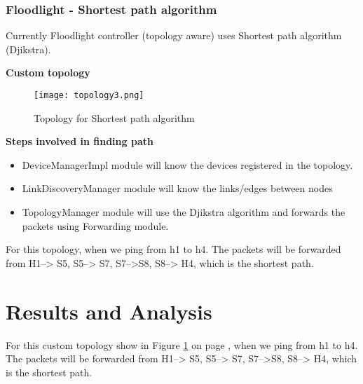 \documentclass[12pt,a4paper]{article}
\begin{document}
\subsubsection{Floodlight - Shortest path algorithm}

Currently Floodlight controller (topology aware) uses Shortest path algorithm (Djikstra).

\textbf{Custom topology}\\
\begin{figure}[H]
\begin{center}

\texttt{[image: topology3.png]}
\end{center}
\label{custom}
\caption{Topology for Shortest path algorithm}
\end{figure}

\textbf{Steps involved in finding path}
\begin{itemize}
\item DeviceManagerImpl module will know the devices registered in the topology.
\item LinkDiscoveryManager module will know the links/edges between nodes
\item TopologyManager module will use the Djikstra algorithm and forwards the packets using Forwarding module.
\end{itemize}

For this topology, when we ping from h1 to h4. The packets will be forwarded from H1--> S5, S5--> S7, S7-->S8, S8--> H4, which is the shortest path.





\newpage
\section{Results and Analysis}
For this custom topology show in Figure \ref{custom} on page \pageref{custom}, when we ping from h1 to h4. The packets will be forwarded from H1--> S5, S5--> S7, S7-->S8, S8--> H4, which is the shortest path.
\end{document}
